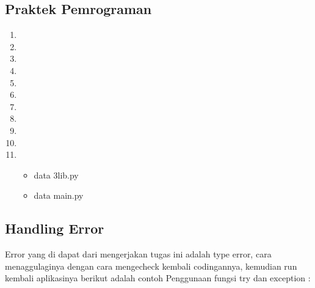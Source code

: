\subsection{Praktek Pemrograman}
	\begin{enumerate}
	\item
	\item
	\item
	\item
	\item
	\item
	\item
	\item
	\item
	\item
	\item
		\begin{itemize}
		\item data 3lib.py
			
		\item data main.py
			
		\end{itemize}
	\end{enumerate}

\subsection{Handling Error}
\par Error yang di dapat dari mengerjakan tugas ini adalah type error, cara menaggulaginya dengan cara mengecheck kembali codingannya, kemudian run kembali aplikasinya berikut adalah contoh Penggunaan fungsi try dan exception :


